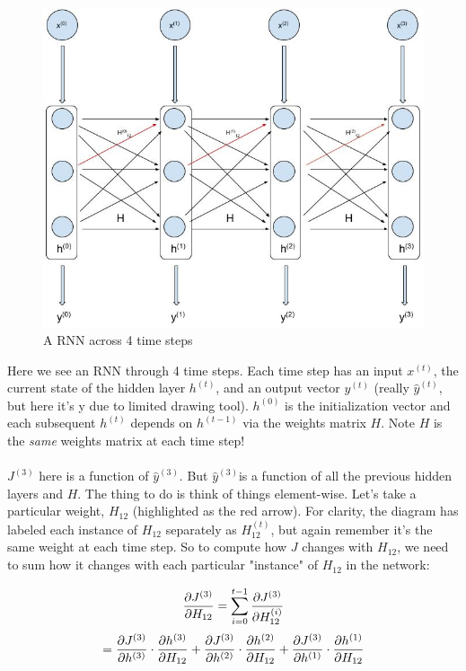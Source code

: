 \documentclass[]{article}
\newcommand{\deriv}[2]{%
	\ensuremath{\frac{\partial {#1}}{\partial {#2}}}}
\newcommand{\slayer}[3]{ %
	\ensuremath{{#1}^{(#2)}_{#3}}}
\newcommand{\vlayer}[2]{ %
	\ensuremath{{#1}^{(#2)}}}
\begin{document}
\begin{figure}[H]
	\centering
	\includegraphics[width=1.0\textwidth]{rnn-unrolled}
	\caption{A RNN across 4 time steps}
	\label{fig:rnn-unrolled}
\end{figure}

Here we see an RNN through 4 time steps. Each time step has an input\vlayer{x}{t}, the current state of the hidden layer\vlayer{h}{t}, and an output vector\vlayer{y}{t} (really \vlayer{\hat{y}}{t}, but here it's y due to limited drawing tool).\vlayer{h}{0} is the initialization vector and each subsequent \vlayer{h}{t} depends on \vlayer{h}{t-1} via the weights matrix $H$. Note $H$ is the \textit{same} weights matrix at each time step!
\paragraph{}
\vlayer{J}{3} here is a function of\vlayer{\hat{y}}{3}. But\vlayer{\hat{y}}{3}is a function of all the previous hidden layers and $H$. The thing to do is think of things element-wise. Let's take a particular weight, $H_{12}$ (highlighted as the red arrow). For clarity, the diagram has labeled each instance of $H_{12}$ separately as \slayer{H}{t}{12}, but again remember it's the same weight at each time step. So to compute how $J$ changes with $H_{12}$, we need to sum how it changes with each particular "instance" of $H_{12}$ in the network:

$$\deriv{\vlayer{J}{3}}{H_{12}} = \sum_{i=0}^{t-1} \deriv{\vlayer{J}{3}}{\slayer{H}{i}{12}}$$
$$ = \deriv{\vlayer{J}{3}}{\vlayer{h}{3}}\cdot\deriv{\vlayer{h}{3}}{H_{12}} + \deriv{\vlayer{J}{3}}{\vlayer{h}{2}}\cdot\deriv{\vlayer{h}{2}}{H_{12}} + \deriv{\vlayer{J}{3}}{\vlayer{h}{1}}\cdot\deriv{\vlayer{h}{1}}{H_{12}}$$
\end{document}
